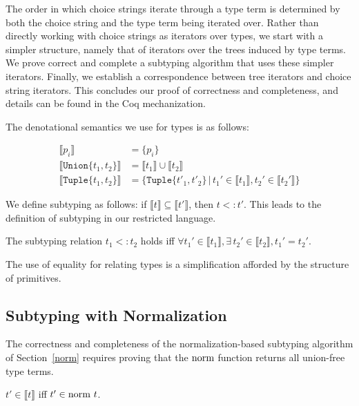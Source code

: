 \documentclass[a4paper,english]{lipics-v2019}
\newcommand{\xt}[1]{\texttt{#1}}
\newcommand{\tuplet}[2]{\xt{Tuple\{}#1,#2\xt{\}}}
\newcommand{\union}[2]{\xt{Union\{}#1,#2\xt{\}}}
\newcommand{\denotes}[1]{\llbracket #1 \rrbracket}
\renewcommand{\c}[1]{\ensuremath{\text{\lstinline{#1}}}\xspace}
\begin{document}
The order in which choice strings iterate through a type term is determined by
both the choice string and the type term being iterated over. Rather than
directly working with choice strings as iterators over types,
we start with a simpler structure, namely that of iterators over the trees
induced by type terms. We prove correct and complete a subtyping algorithm
that uses these simpler iterators. Finally, we establish a correspondence 
between tree iterators and choice string iterators. This concludes our proof
of correctness and completeness, and details can be found in the Coq
mechanization.

The denotational semantics we use for types is as follows:

\vspace{-5mm}
\begin{align*}
\denotes{p_i} &= \{p_i\} \\
\denotes{\union{t_1}{t_2}} &= \denotes{t_1} \cup \denotes{t_2} \\
\denotes{\tuplet{t_1}{t_2}} &= \{\tuplet{t'_1}{t'_2} \,|\, t_1' \in \denotes{t_1},  t_2' \in \denotes{t_2'}\}
\end{align*}
\vspace{-5mm}

\noindent
We define subtyping as follows: if $\denotes{t}\subseteq\denotes{t'}$, then
$t<:t'$.  This leads to the definition of subtyping in our restricted language.

\begin{definition}
 The subtyping relation $t_1 <: t_2$ holds iff $\forall t_1' \in
\denotes{t_1}, \exists\, t_2' \in \denotes{t_2}, t_1' =
t_2'$.\label{dfn:scr}
\end{definition}

\noindent
The use of equality for relating types is a simplification afforded by the
structure of primitives.

\subsection{Subtyping with Normalization}

The correctness and completeness of the normalization-based subtyping
algorithm of Section~\ref{norm} requires proving that the \c{norm}
function returns all union-free type terms.

\begin{lemma}[NF Equivalence]\label{lem:equiv_ndet}
$t' \in \denotes{t}$ iff $t' \in \c{norm}~ t$.
\end{lemma}
\end{document}

